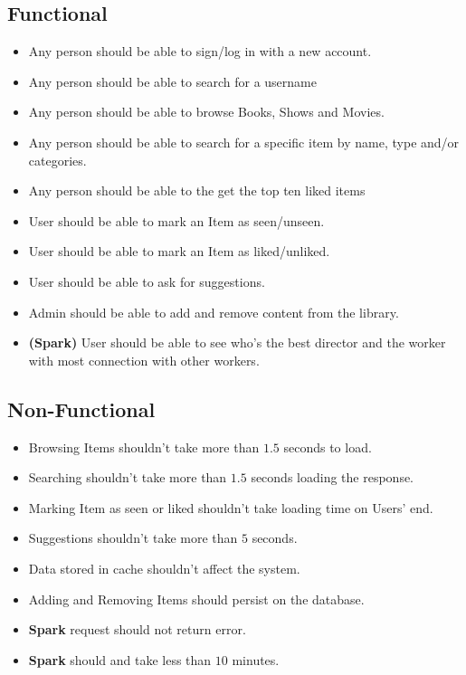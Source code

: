\documentclass{article}
\begin{document}
  \subsection{Functional}
    \begin{itemize}
      \item Any person should be able to sign/log in with a new account.
      \item Any person should be able to search for a username
      \item Any person should be able to browse Books, Shows and Movies.
      \item Any person should be able to search for a specific item by name, type and/or categories.
      \item Any person should be able to the get the top ten liked items
      \item User should be able to mark an Item as seen/unseen.
      \item User should be able to mark an Item as liked/unliked.
      \item User should be able to ask for suggestions.
      \item Admin should be able to add and remove content from the library.
      \item \textbf{(Spark)} User should be able to see who's the best director and the worker with most connection with other workers.
    \end{itemize}

  \subsection{Non-Functional}
    \begin{itemize}
      \item Browsing Items shouldn't take more than $1.5$ seconds to load.
      \item Searching shouldn't take more than $1.5$ seconds loading the response.
      \item Marking Item as seen or liked shouldn't take loading time on Users' end.
      \item Suggestions shouldn't take more than $5$ seconds.
      \item Data stored in cache shouldn't affect the system.
      \item Adding and Removing Items should persist on the database.
      \item \textbf{Spark} request should not return error.
      \item \textbf{Spark} should and take less than $10$ minutes.
    \end{itemize}
\end{document}
